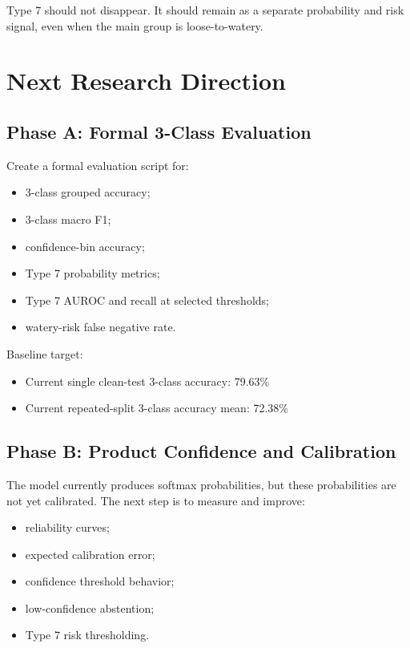 \documentclass[11pt]{article}
\begin{document}
Type 7 should not disappear. It should remain as a separate probability and risk signal, even when the main group is loose-to-watery.

\section{Next Research Direction}

\subsection{Phase A: Formal 3-Class Evaluation}

Create a formal evaluation script for:

\begin{itemize}
    \item 3-class grouped accuracy;
    \item 3-class macro F1;
    \item confidence-bin accuracy;
    \item Type 7 probability metrics;
    \item Type 7 AUROC and recall at selected thresholds;
    \item watery-risk false negative rate.
\end{itemize}

Baseline target:

\begin{itemize}
    \item Current single clean-test 3-class accuracy: 79.63\%
    \item Current repeated-split 3-class accuracy mean: 72.38\%
\end{itemize}

\subsection{Phase B: Product Confidence and Calibration}

The model currently produces softmax probabilities, but these probabilities are not yet calibrated. The next step is to measure and improve:

\begin{itemize}
    \item reliability curves;
    \item expected calibration error;
    \item confidence threshold behavior;
    \item low-confidence abstention;
    \item Type 7 risk thresholding.
\end{itemize}
\end{document}
